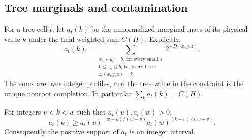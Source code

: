 \subsection{Tree marginals and contamination}

For a tree cell \(t\), let \(a_t(k)\) be the unnormalized marginal
mass of its physical value \(k\) under the final weighted sum
\(C(H)\).
Explicitly,
\begin{equation}
 a_t(k)=
 \sum_{\substack{x_s+y_s=b_s\ \text{for every small }s\\
                  0\le z_e\le b_e\ \text{for every free }e\\
                  z_t(x,y,z)=k}}
 2^{-D(x,y,z)}.
 \label{eq:tree-marginal-definition}
\end{equation}
The sums are over integer profiles, and the tree value in the
constraint is the unique nonroot completion.
In particular \(\sum_k a_t(k)=C(H)\).

\begin{lemma}
\label{lem:tree-marginal}
For integers \(v<k<w\) such that \(a_t(v),a_t(w)>0\),
\begin{equation}
 a_t(k)\ge
 a_t(v)^{(w-k)/(w-v)}
 a_t(w)^{(k-v)/(w-v)}.
 \label{eq:tree-marginal-interpolation}
\end{equation}
Consequently the positive support of \(a_t\) is an integer interval.
\end{lemma}

